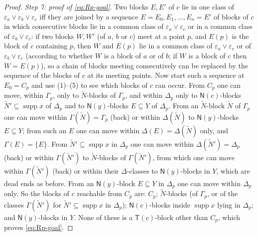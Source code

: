 \documentclass[11pt]{amsart}
\theoremstyle{definition}
\newcommand{\supp}{\operatorname{supp}}
\newcommand{\T}{\mathsf{T}}
\newcommand{\N}{\mathsf{N}}
\begin{document}
\begin{proof}
\emph{Step 7: proof of \eqref{eq:Rp-goal}.} Two blocks $E,E'$ of $c$ lie in one class of $\varepsilon_a\vee\varepsilon_b\vee\varepsilon_c$ iff they are joined by a sequence $E=E_0,E_1,\dots,E_n=E'$ of blocks of $c$ in which consecutive blocks lie in a common class of $\varepsilon_a\vee\varepsilon_c$ or in a common class of $\varepsilon_b\vee\varepsilon_c$: if two blocks $W,W'$ (of $a$, $b$ or $c$) meet at a point $p$, and $E(p)$ is the block of $c$ containing $p$, then $W$ and $E(p)$ lie in a common class of $\varepsilon_a\vee\varepsilon_c$ or of $\varepsilon_b\vee\varepsilon_c$ (according to whether $W$ is a block of $a$ or of $b$; if $W$ is a block of $c$ then $W=E(p)$), so a chain of blocks meeting consecutively can be replaced by the sequence of the blocks of $c$ at its meeting points. Now start such a sequence at $E_0=C_p$ and use (1)--(5) to see which blocks of $c$ can occur. From $C_p$ one can move, within $\Gamma_p$, only to $\tilde N$-blocks of $\Gamma_p$, and within $\Delta_p$ only to $\N(c)$-blocks $\tilde N'\subseteq\supp x$ of $\Delta_p$ and to $\N(y)$-blocks $E\subseteq Y$ of $\Delta_p$. From an $\tilde N$-block $\tilde N$ of $\Gamma_p$ one can move within $\Gamma(\tilde N)=\Gamma_p$ (back) or within $\Delta(\tilde N)$ to $\N(y)$-blocks $E\subseteq Y$; from such an $E$ one can move within $\Delta(E)=\Delta(\tilde N)$ only, and $\Gamma(E)=\{E\}$. From $\tilde N'\subseteq\supp x$ in $\Delta_p$ one can move within $\Delta(\tilde N')=\Delta_p$ (back) or within $\Gamma(\tilde N')$ to $\tilde N$-blocks of $\Gamma(\tilde N')$, from which one can move within $\Gamma(\tilde N')$ (back) or within their $\Delta$-classes to $\N(y)$-blocks in $Y$, which are dead ends as before. From an $\N(y)$-block $E\subseteq Y$ in $\Delta_p$ one can move within $\Delta_p$ only. So the blocks of $c$ reachable from $C_p$ are: $C_p$; $\tilde N$-blocks (of $\Gamma_p$, or of the classes $\Gamma(\tilde N')$ for $\tilde N'\subseteq\supp x$ in $\Delta_p$); $\N(c)$-blocks inside $\supp x$ lying in $\Delta_p$; and $\N(y)$-blocks in $Y$. None of these is a $\T(c)$-block other than $C_p$, which proves \eqref{eq:Rp-goal}.


\end{proof}
\end{document}
